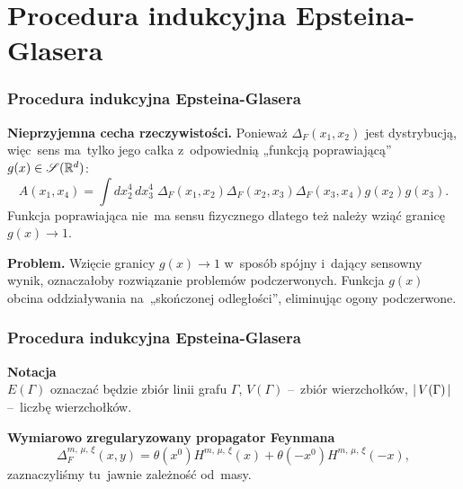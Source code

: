 \documentclass[10pt,t]{beamer}
\begin{document}
\section{Procedura indukcyjna Epsteina-Glasera}



\begin{frame}
  \frametitle{Procedura indukcyjna Epsteina-Glasera}


  \textbf{Nieprzyjemna cecha rzeczywistości.}
  Ponieważ $\Delta_{ F }( x_{ 1 }, x_{ 2 } )$ jest dystrybucją, więc~sens
  ma~tylko jego całka z~odpowiednią „funkcją poprawiającą”
  $g( x ) \in \mathcal{S}( \mathbb{R}^{ d } )$:
  \begin{equation}
    \label{eq:Epstein-Glaser-19}
    A( x_{ 1 }, x_{ 4 } ) =
    \int d x_{ 2 }^{ 4 } \, d x_{ 3 }^{ 4 } \; \Delta_{ F }( x_{ 1 }, x_{ 2 } )
    \Delta_{ F }( x_{ 2 }, x_{ 3 } ) \Delta_{ F }( x_{ 3 }, x_{ 4 } )
    g( x_{ 2 } ) g( x_{ 3 } ).
  \end{equation}
  Funkcja poprawiająca nie~ma sensu fizycznego dlatego też należy
  wziąć granicę $g( x ) \to 1$.

  \vspace{\spaceThree}



  \textbf{Problem.}
  Wzięcie granicy $g( x ) \to 1$ w~sposób spójny i~dający sensowny
  wynik, oznaczałoby rozwiązanie problemów podczerwonych. Funkcja
  $g( x )$ obcina oddziaływania na~„skończonej odległości”,
  eliminując ogony podczerwone.

\end{frame}





\begin{frame}
  \frametitle{Procedura indukcyjna Epsteina-Glasera}


  \textbf{Notacja} \\
  $E( \Gamma )$ oznaczać będzie zbiór linii grafu $\Gamma$,
  $V( \Gamma )$ --~zbiór wierzchołków, $|\, {  V( \Gamma )  } \,|$ --~liczbę
  wierzchołków.

  \textbf{Wymiarowo zregularyzowany propagator Feynmana} \\
  \begin{equation}
    \label{eq:Epstein-Glaser-20}
    \Delta_{ F }^{ m,\, \mu,\, \xi }( x, y ) =
    \theta( x^{ 0 } ) H^{ m,\, \mu,\, \xi }( x ) + \theta( -x^{ 0 } )
    H^{ m,\, \mu,\, \xi }( -x ),
  \end{equation}
  zaznaczyliśmy tu~jawnie zależność od~masy.

\end{frame}
\end{document}
